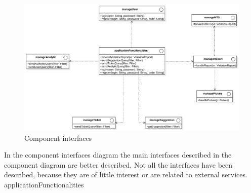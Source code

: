 \documentclass[./main.tex]{subfiles}
\begin{document}
\begin{figure}[H]
\centering
\includegraphics[width=\textwidth]{resources/interfaces_diagram}
\caption{Component interfaces}
\label{fig:interfaces}
\end{figure}

In the component interfaces diagram the main interfaces described in the component diagram are better described. Not all the interfaces have been described, because they are of little interest or are related to external services.\\
applicationFunctionalities 
\end{document}
